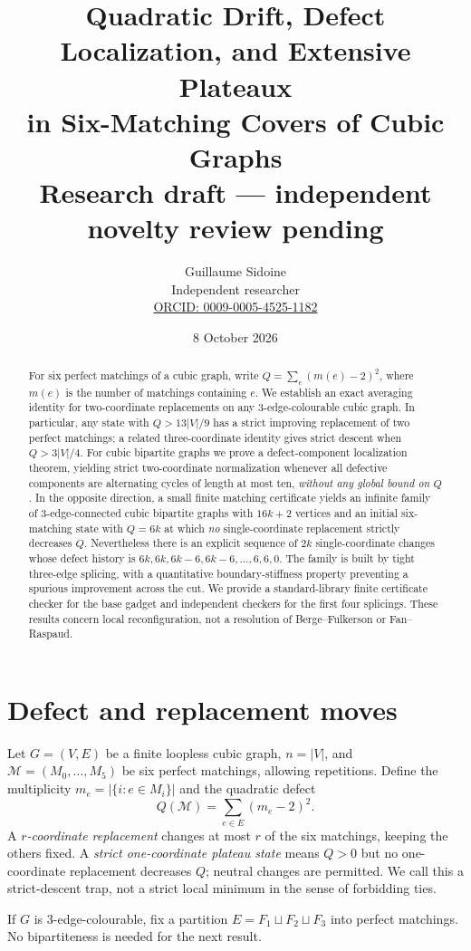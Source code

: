 \documentclass[11pt]{article}
\title{Quadratic Drift, Defect Localization, and Extensive Plateaux\\ in Six-Matching Covers of Cubic Graphs\\\large Research draft --- independent novelty review pending}
\author{Guillaume Sidoine\\Independent researcher\\\href{https://orcid.org/0009-0005-4525-1182}{ORCID: 0009-0005-4525-1182}}
\date{8 October 2026}
\newcommand{\M}{\mathcal M}
\begin{document}
\maketitle
\begin{abstract}
For six perfect matchings of a cubic graph, write $Q=\sum_e(m(e)-2)^2$, where $m(e)$ is the number of matchings containing $e$. We establish an exact averaging identity for two-coordinate replacements on any $3$-edge-colourable cubic graph. In particular, any state with $Q>13|V|/9$ has a strict improving replacement of two perfect matchings; a related three-coordinate identity gives strict descent when $Q>3|V|/4$. For cubic bipartite graphs we prove a defect-component localization theorem, yielding strict two-coordinate normalization whenever all defective components are alternating cycles of length at most ten, \emph{without any global bound on $Q$}. In the opposite direction, a small finite matching certificate yields an infinite family of $3$-edge-connected cubic bipartite graphs with $16k+2$ vertices and an initial six-matching state with $Q=6k$ at which \emph{no} single-coordinate replacement strictly decreases $Q$. Nevertheless there is an explicit sequence of $2k$ single-coordinate changes whose defect history is $6k,6k,6k-6,6k-6,\ldots,6,6,0$. The family is built by tight three-edge splicing, with a quantitative boundary-stiffness property preventing a spurious improvement across the cut. We provide a standard-library finite certificate checker for the base gadget and independent checkers for the first four splicings. These results concern local reconfiguration, not a resolution of Berge--Fulkerson or Fan--Raspaud.
\end{abstract}

\section{Defect and replacement moves}
Let $G=(V,E)$ be a finite loopless cubic graph, $n=|V|$, and $\M=(M_0,\ldots,M_5)$ be six perfect matchings, allowing repetitions. Define the multiplicity $m_e=|\{i:e\in M_i\}|$ and the quadratic defect
\[
Q(\M)=\sum_{e\in E}(m_e-2)^2.
\]
A \emph{$r$-coordinate replacement} changes at most $r$ of the six matchings, keeping the others fixed. A \emph{strict one-coordinate plateau state} means $Q>0$ but no one-coordinate replacement decreases $Q$; neutral changes are permitted. We call this a strict-descent trap, not a strict local minimum in the sense of forbidding ties.

If $G$ is $3$-edge-colourable, fix a partition $E=F_1\sqcup F_2\sqcup F_3$ into perfect matchings. No bipartiteness is needed for the next result.
\end{document}
